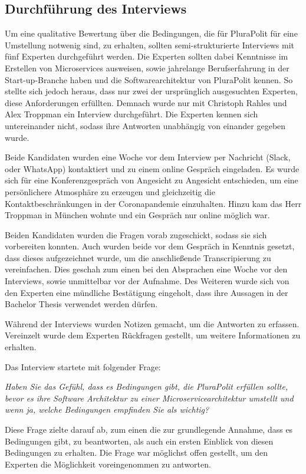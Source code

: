 \subsection{Durchführung des Interviews}

Um eine qualitative Bewertung über die Bedingungen, die für PluraPolit für eine Umstellung notwenig sind, zu erhalten, sollten semi-strukturierte Interviews mit fünf Experten durchgeführt werden. Die Experten sollten dabei Kenntnisse im Erstellen von Microservices ausweisen, sowie jahrelange Berufserfahrung in der Start-up-Branche haben und die Softwarearchitektur von PluraPolit kennen. So stellte sich jedoch heraus, dass nur zwei der ursprünglich ausgesuchten Experten, diese Anforderungen erfüllten. Demnach wurde nur mit Christoph Rahles und Alex Troppman ein Interview durchgeführt. Die Experten kennen sich untereinander nicht, sodass ihre Antworten unabhängig von einander gegeben wurde.

Beide Kandidaten wurden eine Woche vor dem Interview per Nachricht (Slack, oder WhatsApp) kontaktiert und zu einem online Gespräch eingeladen. Es wurde sich für eine Konferenzgespräch von Angesicht zu Angesicht entschieden, um eine persönlichere Atmosphäre zu erzeugen und gleichzeitig die Kontaktbeschränkungen in der Coronapandemie einzuhalten. Hinzu kam das Herr Troppman in München wohnte und ein Gespräch nur online möglich war.

Beiden Kandidaten wurden die Fragen vorab zugeschickt, sodass sie sich vorbereiten konnten. Auch wurden beide vor dem Gespräch in Kenntnis gesetzt, dass dieses aufgezeichnet wurde, um die anschließende Transcripierung zu vereinfachen. Dies geschah zum einen bei den Absprachen eine Woche vor den Interviews, sowie unmittelbar vor der Aufnahme. Des Weiteren wurde sich von den Experten eine mündliche Bestätigung eingeholt, dass ihre Aussagen in der Bachelor Thesis verwendet werden dürfen.

Während der Interviews wurden Notizen gemacht, um die Antworten zu erfassen. Vereinzelt wurde dem Experten Rückfragen gestellt, um weitere Informationen zu erhalten.

Das Interview startete mit folgender Frage:

\textit{Haben Sie das Gefühl, dass es Bedingungen gibt, die PluraPolit erfüllen sollte, bevor es ihre Software Architektur zu einer Microservicearchitektur umstellt und wenn ja, welche Bedingungen empfinden Sie als wichtig?}

Diese Frage zielte darauf ab, zum einen die zur grundlegende Annahme, dass es Bedingungen gibt, zu beantworten, als auch ein ersten Einblick von diesen Bedingungen zu erhalten. Die Frage war möglichst offen gestellt, um den Experten die Möglichkeit voreingenommen zu antworten.
